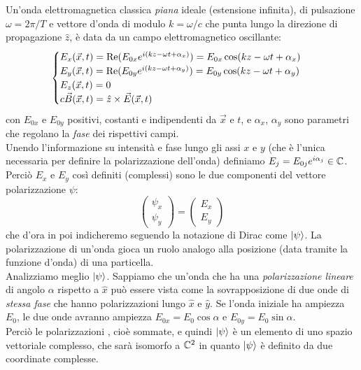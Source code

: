 \documentclass[FisicaTeorica.tex]{subfiles}
\begin{document}
Un'onda elettromagnetica classica \textit{piana} ideale (estensione infinita), di pulsazione $\omega = 2\pi/T$ e vettore d'onda di modulo $k = \omega/c$ che punta lungo la direzione di propagazione $\hat{z}$, è data da un campo elettromagnetico oscillante:
\[
\begin{cases}
E_x(\vec{x},t) = \operatorname{Re}(E_{0x} e^{i(kz-\omega t + \alpha_x)}) = E_{0x}\cos(kz-\omega t+\alpha_x)\\
E_y(\vec{x},t) = \operatorname{Re}(E_{0y} e^{i(kz-\omega t + \alpha_y)}) = E_{0y}\cos(kz-\omega t+\alpha_y)\\
E_z(\vec{x},t) = 0\\
c \vec{B}(\vec{x},t) = \hat{z} \times \vec{E}(\vec{x},t)
\end{cases}
\]
con $E_{0x}$ e $E_{0y}$ positivi, costanti e indipendenti da $\vec{x}$ e $t$, e $\alpha_x$, $\alpha_y$ sono parametri che regolano la \textit{fase} dei rispettivi campi.\\
Unendo l'informazione su intensità e fase lungo gli assi $x$ e $y$ (che è l'unica necessaria per definire la polarizzazione dell'onda) definiamo $E_j = E_{0j} e^{i\alpha_j} \in \mathbb{C}$. Perciò $E_x$ e $E_y$ così definiti (complessi) sono le due componenti del vettore  polarizzazione $\psi$:
\[
\begin{pmatrix}
\psi_x\\ \psi_y
\end{pmatrix} = \begin{pmatrix}
E_x\\
E_y
\end{pmatrix}
\]
che d'ora in poi indicheremo seguendo la notazione di Dirac come $\Ket{\psi}$. La polarizzazione di un'onda gioca un ruolo analogo alla posizione (data tramite la funzione d'onda) di una particella.\\
Analizziamo meglio $\Ket{\psi}$. Sappiamo che un'onda che ha una \textit{polarizzazione lineare} di angolo $\alpha$ rispetto a $\hat{x}$ può essere vista come la sovrapposizione di due onde di \textit{stessa fase} che hanno polarizzazioni lungo $\hat{x}$ e $\hat{y}$. Se l'onda iniziale ha ampiezza $E_0$, le due onde  avranno ampiezza $E_{0x} = E_0\cos\alpha$ e $E_{0y} = E_0\sin\alpha$.\\ %
Perciò le polarizzazioni , cioè sommate, e quindi $\Ket{\psi}$ è un elemento di uno spazio vettoriale complesso, che sarà isomorfo a $\mathbb{C}^2$ in quanto $\Ket{\psi}$ è definito da due coordinate complesse.\\
\end{document}
